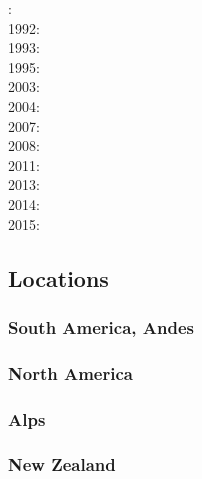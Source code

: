 : \cite{brpo81}\\
1992: \cite{vayv92}\cite{zaju92}\cite{wein92}\cite{wesc92}\\
1993: \cite{kesb93}\cite{nabr93}\cite{potp93}\cite{povp93}\cite{vasv93}\cite{poli93}\cite{popt93}\cite{wein93}\\
1995: \cite{wepo95}\cite{bisc95}\cite{wepo95}\\
2003: \cite{geur03}\cite{vavs03}\\
2004: \cite{gepm04}\cite{istt04}\cite{geur04}\\
2007: \cite{gebu07}\\
2008: \cite{buge08}\cite{zlfd08}\\
2011: \cite{ellw11}\\
2013: \cite{fusc13}\\
2014: \cite{feka14b}\\
2015: \cite{feka15}\cite{fuks15}


\subsection*{Locations}


\subsubsection*{South America, Andes} 

\cite{wdbo94b}
\cite{basv06}
\cite{robn16}

\subsubsection*{North America} 

\cite{bugm97}

\subsubsection*{Alps} 

\cite{buge05}

\subsubsection*{New Zealand} 

\cite{koon90}
\cite{brbe95}
\cite{bekh96}
\cite{babr99}
\cite{libi06}
\cite{gedh02}\cite{pybf02}
\cite{gehd03}\cite{konc03}\cite{upke03}
\cite{pyeg10}
\cite{grel12}

